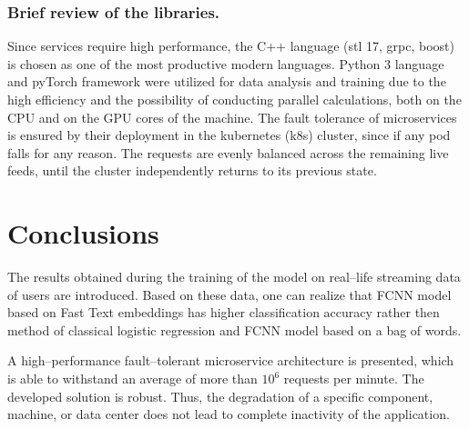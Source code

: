 \documentclass[12pt]{jpconf}
\begin{document}
\subsubsection*{Brief review of the libraries.}
Since services require high performance, the C++ language (stl 17, grpc, boost) is chosen as one of the most productive modern languages. Python 3 language and pyTorch framework were utilized for data analysis and training due to the high efficiency and the possibility of conducting parallel calculations, both on the CPU and on the GPU cores of the machine.
The fault tolerance of microservices is ensured by their deployment in the kubernetes (k8s) cluster, since if any pod falls for any reason. The requests are evenly balanced across the remaining live feeds, until the cluster independently returns to its previous state. 

\section{Conclusions}

The results obtained during the training of the model on real--life streaming data of users are introduced. Based on these data, one can realize that FCNN model based on Fast Text embeddings has higher classification accuracy rather then method of classical logistic regression and FCNN  model based on a bag of words.

A high--performance fault--tolerant microservice architecture is presented, which is able to withstand an average of more than $10^6$ requests per minute. The developed solution is robust. Thus, the degradation of a specific component, machine, or data center does not lead to complete inactivity of the application.
\end{document}
